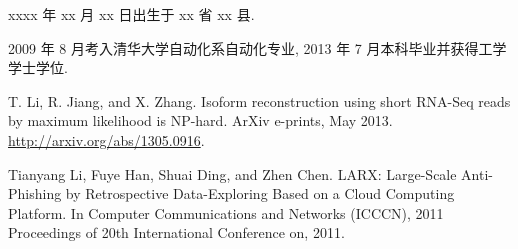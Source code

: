\begin{resume}


  xxxx 年 xx 月 xx 日出生于 xx 省 xx 县. 
  
  2009 年 8 月考入清华大学自动化系自动化专业, 2013 年 7 月本科毕业并获得工学学士学位. 


  \begin{enumerate}[{[}1{]}]
	\item T. Li, R. Jiang, and X. Zhang. 
	Isoform reconstruction using short RNA-Seq reads by maximum likelihood is NP-hard. 
	ArXiv e-prints, May 2013. \url{http://arxiv.org/abs/1305.0916}.

	\item Tianyang Li, Fuye Han, Shuai Ding, and Zhen Chen. 
	LARX: Large-Scale Anti-Phishing by Retrospective Data-Exploring Based on a Cloud Computing Platform. 
	In Computer Communications and Networks (ICCCN), 2011 
	Proceedings of 20th International Conference on, 2011.
  \end{enumerate}
  
\end{resume}
